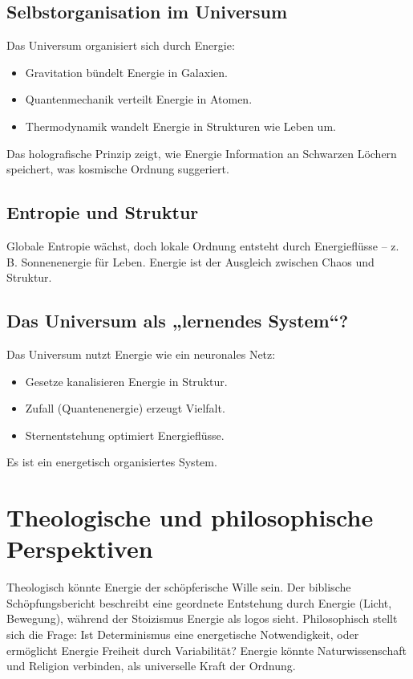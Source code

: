 \documentclass{article}
\begin{document}
	\subsection*{Selbstorganisation im Universum}
	Das Universum organisiert sich durch Energie:
	\begin{itemize}
		\item Gravitation bündelt Energie in Galaxien.
		\item Quantenmechanik verteilt Energie in Atomen.
		\item Thermodynamik wandelt Energie in Strukturen wie Leben um.
	\end{itemize}
	Das holografische Prinzip zeigt, wie Energie Information an Schwarzen Löchern speichert, was kosmische Ordnung suggeriert.
	
	\subsection*{Entropie und Struktur}
	Globale Entropie wächst, doch lokale Ordnung entsteht durch Energieflüsse – z. B. Sonnenenergie für Leben. Energie ist der Ausgleich zwischen Chaos und Struktur.
	
	\subsection*{Das Universum als „lernendes System“?}
	Das Universum nutzt Energie wie ein neuronales Netz:
	\begin{itemize}
		\item Gesetze kanalisieren Energie in Struktur.
		\item Zufall (Quantenenergie) erzeugt Vielfalt.
		\item Sternentstehung optimiert Energieflüsse.
	\end{itemize}
	Es ist ein energetisch organisiertes System.
	
	\section{Theologische und philosophische Perspektiven}
	Theologisch könnte Energie der schöpferische Wille sein. Der biblische Schöpfungsbericht beschreibt eine geordnete Entstehung durch Energie (Licht, Bewegung), während der Stoizismus Energie als logos sieht. Philosophisch stellt sich die Frage: Ist Determinismus eine energetische Notwendigkeit, oder ermöglicht Energie Freiheit durch Variabilität? Energie könnte Naturwissenschaft und Religion verbinden, als universelle Kraft der Ordnung.
	
\end{document}
